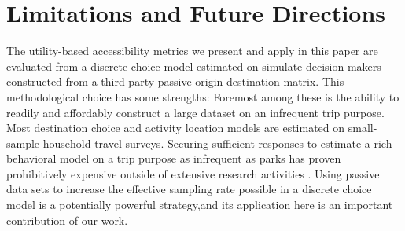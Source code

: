 \documentclass[3p, authoryear, review]{elsarticle} %
\begin{document}
\begin{table}

\caption{\label{tab:equity}Equity Distribution of Street Opening Benefits}
\centering
{}
\end{table}

\hypertarget{limitations}{%
\section{Limitations and Future Directions}\label{limitations}}

The utility-based accessibility metrics we present and apply in this paper are evaluated from a discrete choice model estimated on simulate decision makers constructed from a third-party passive origin-destination matrix. This methodological choice has some strengths: Foremost among these is the ability to readily and affordably construct a large dataset on an infrequent trip purpose. Most destination choice and activity location models are estimated on small-sample household travel surveys. Securing sufficient responses to estimate a rich behavioral model on a trip purpose as infrequent as parks has proven prohibitively expensive outside of extensive research activities \citep[e.g.,][]{Kaczynski2016}. Using passive data sets to increase the effective sampling rate possible in a discrete choice model is a potentially powerful strategy,and its application here is an important contribution of our work.
\end{document}
